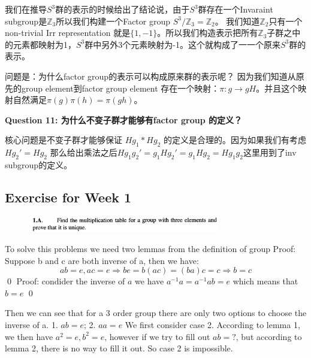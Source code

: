 我们在推导$ S^3 $群的表示的时候给出了结论说，由于$ S^3 $群存在一个Invaraint subgroup是$ \mathbb{Z}_3 $所以我们构建一个Factor group $ S^3/\mathbb{Z}_3  = \mathbb{Z}_2 $。 我们知道$ \mathbb{Z}_2 $只有一个non-trivial Irr representation 就是$ \{1,-1\} $。所以我们构造表示把所有$ \mathbb{Z}_3 $子群之中的元素都映射为1，$ S^3 $群中另外3个元素映射为-1。这个就构成了一一个原来$ S^3 $群的表示。

问题是：为什么factor group的表示可以构成原来群的表示呢？
\bigskip
因为我们知道从原先的group element到factor group element 存在一个映射：$ \pi : g \to gH$。并且这个映射自然满足$ \pi(g) \pi(h) = \pi(gh) $。


\textbf{Question 11: 为什么不变子群才能够有factor group 的定义？}

核心问题是不变子群才能够保证 $ Hg_1 * Hg_2 $ 的定义是合理的。因为如果我们有考虑$ Hg_2' = Hg_2 $ 那么给出乘法之后$ H g_1 g_2' = g_1 H g_2' = g_1Hg_2 = H g_1 g_2 $这里用到了inv subgroup的定义。



\newpage
\subsection{Exercise for Week 1}

\begin{figure}[H]
  \centering
  \includegraphics[width=0.75\textwidth]{assets/A1ques.png}
  \label{fig:a1ques}
\end{figure}

To solve this problems we need two lemmas from the definition of group
Proof: Suppose b and c are both inverse of a, then we have:
\begin{equation}
  a b = e, a c = e \Rightarrow b e = b(ac) =(ba)c = c \Rightarrow b = c
  \label{eq:inverseunique}
\end{equation}
\qed
{}
Proof: condider the inverse of $ a $ we have $ a^{-1}a = a^{-1}ab = e $ which means that $ b = e $
\qed 

Then we can see that for a 3 order group there are only two options to choose the inverse of a. 1. $ a b = e $; 2. $ aa = e $ 
We first consider case 2. According to lemma 1, we then have $ a^2 = e, b^2=e $, however if we try to fill out $ ab = ? $, but according to lemma 2, there is no way to fill it out. So case 2 is impossible.

